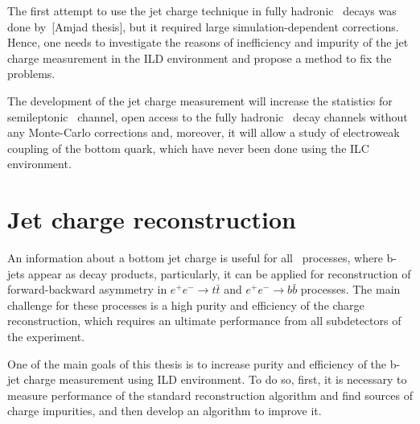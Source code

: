 The first attempt to use the jet charge technique in fully hadronic \ttbar\ decays was done by~[Amjad thesis], but it required large simulation-dependent corrections. 
Hence, one needs to investigate the reasons of inefficiency and impurity of the jet charge measurement in the ILD environment and propose a method to fix the problems. 



The development of the jet charge measurement will increase the statistics for semileptonic \ttbar\ channel,  open access to the fully hadronic \ttbar\ decay channels without any Monte-Carlo corrections and, moreover, it will allow a study of electroweak coupling of the bottom quark, which have never been done using the ILC environment. 




\section{Jet charge reconstruction}
\label{sec:JetChargeReconstruction}
An information about a bottom jet charge is useful for all \sm\ processes, where b-jets appear as decay products, particularly, it can be applied for reconstruction of forward-backward asymmetry in $e^+e^-\to t\bar{t}$ and $e^+e^- \to b\bar{b}$ processes. 
The main challenge for these processes is a high purity and efficiency of the charge reconstruction, which requires an ultimate performance from all subdetectors of the experiment. 

One of the main goals of this thesis is to increase purity and efficiency of the b-jet charge measurement using ILD environment. 
To do so, first, it is necessary to measure performance of the standard reconstruction algorithm and find sources of charge impurities, and then develop an algorithm to improve it. 



